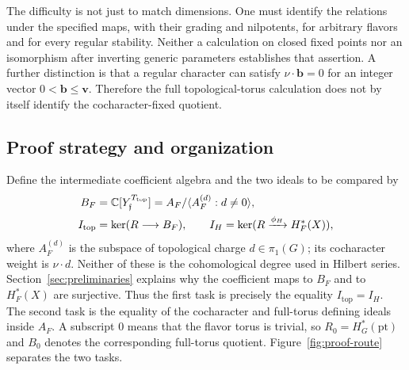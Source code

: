 The difficulty is not just to match dimensions.  One must identify the
relations under the specified maps, with their grading and nilpotents,
for arbitrary flavors and for every regular stability.  Neither a
calculation on closed fixed points nor an isomorphism after inverting
generic parameters establishes that assertion.  A further distinction is
that a regular character can satisfy $\nu\cdot\mathbf b=0$ for an integer
vector $0<\mathbf b\leq\mathbf v$.  Therefore the full topological-torus calculation
does not by itself identify the cocharacter-fixed quotient.

\subsection{Proof strategy and organization}

Define the intermediate coefficient algebra and the two ideals to be
compared by
\begin{equation}\label{eq:intro-two-ideals}
 \begin{split}
 B_F&=\mathbb C[Y_{\mathfrak f}^{T_{\mathrm{top}}}]
      =A_F/\langle A_F^{(d)}:d\ne0\rangle,\\
 I_{\mathrm{top}}&=\ker(R\longrightarrow B_F),\qquad
 I_H=\ker(R\xrightarrow{\phi_H}H_F^*(X)),
 \end{split}
\end{equation}
where $A_F^{(d)}$ is the subspace of topological charge
$d\in\pi_1(G)$; its cocharacter weight is $\nu\cdot d$.  Neither of
these is the cohomological degree used in Hilbert series.
Section~\ref{sec:preliminaries} explains why the
coefficient maps to $B_F$ and to $H_F^*(X)$ are surjective.
Thus the first task is precisely the equality
$I_{\mathrm{top}}=I_H$.  The second task is the equality of the
cocharacter and full-torus defining ideals inside $A_F$.
A subscript $0$ means that the flavor torus is trivial, so
$R_0=H_G^*(\mathrm{pt})$ and $B_0$ denotes the corresponding full-torus
quotient.  Figure~\ref{fig:proof-route} separates the two tasks.

